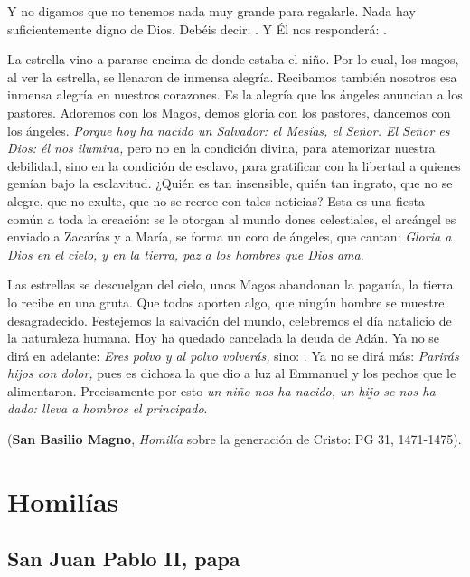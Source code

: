 Y no digamos que no tenemos nada muy grande para regalarle. Nada hay suficientemente digno de Dios. Debéis decir: . Y Él nos responderá: .

La estrella vino a pararse encima de donde estaba el niño. Por lo cual, los magos, al ver la estrella, se llenaron de inmensa alegría. Recibamos también nosotros esa inmensa alegría en nuestros corazones. Es la alegría que los ángeles anuncian a los pastores. Adoremos con los Magos, demos gloria con los pastores, dancemos con los ángeles. \emph{Porque hoy ha nacido un Salvador: el Mesías, el Señor. El Señor es Dios: él nos ilumina,} pero no en la condición divina, para atemorizar nuestra debilidad, sino en la condición de esclavo, para gratificar con la libertad a quienes gemían bajo la esclavitud. ¿Quién es tan insensible, quién tan ingrato, que no se alegre, que no exulte, que no se recree con tales noticias? Esta es una fiesta común a toda la creación: se le otorgan al mundo dones celestiales, el arcángel es enviado a Zacarías y a María, se forma un coro de ángeles, que cantan: \emph{Gloria a Dios en el cielo, y en la tierra, paz a los hombres que Dios ama}.

Las estrellas se descuelgan del cielo, unos Magos abandonan la paganía, la tierra lo recibe en una gruta. Que todos aporten algo, que ningún hombre se muestre desagradecido. Festejemos la salvación del mundo, celebremos el día natalicio de la naturaleza humana. Hoy ha quedado cancelada la deuda de Adán. Ya no se dirá en adelante: \emph{Eres polvo y al polvo volverás,} sino: . Ya no se dirá más: \emph{Parirás hijos con dolor,} pues es dichosa la que dio a luz al Emmanuel y los pechos que le alimentaron. Precisamente por esto \emph{un niño nos ha nacido, un hijo se nos ha dado: lleva a hombros el principado}.

(\textbf{San Basilio Magno}, \emph{Homilía} sobre la generación de Cristo: PG 31, 1471-1475).

\section{Homilías}

\subsection{San Juan Pablo II, papa}

